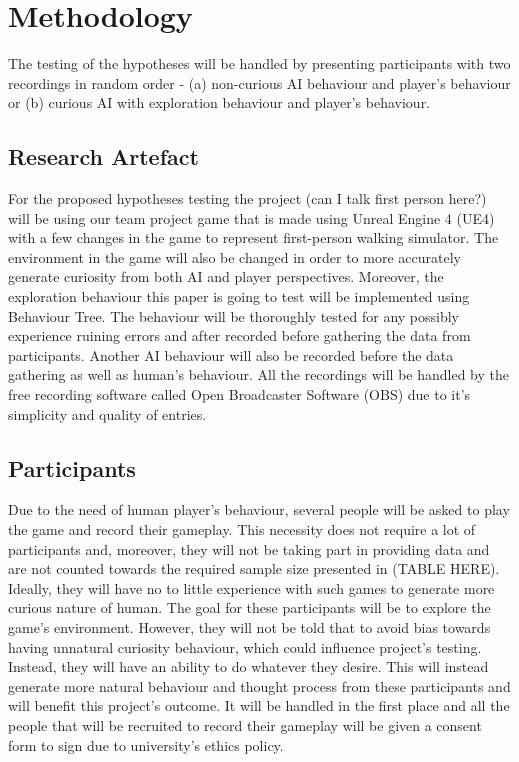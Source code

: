 \documentclass[journal]{IEEEtran}
\begin{document}
\section{Methodology}
The testing of the hypotheses will be handled by presenting participants with two recordings in random order - (a) non-curious AI behaviour and player's behaviour or (b) curious AI with exploration behaviour and player's behaviour.

\subsection{Research Artefact}
For the proposed hypotheses testing the project (can I talk first person here?) will be using our team project game that is made using Unreal Engine 4 (UE4) with a few changes in the game to represent first-person walking simulator. The environment in the game will also be changed in order to more accurately generate curiosity from both AI and player perspectives. Moreover, the exploration behaviour this paper is going to test will be implemented using Behaviour Tree. The behaviour will be thoroughly tested for any possibly experience ruining errors and after recorded before gathering the data from participants. Another AI behaviour will also be recorded before the data gathering as well as human's behaviour. All the recordings will be handled by the free recording software called Open Broadcaster Software (OBS) due to it's simplicity and quality of entries.

\subsection{Participants}
Due to the need of human player's behaviour, several people will be asked to play the game and record their gameplay. This necessity does not require a lot of participants and, moreover, they will not be taking part in providing data and are not counted towards the required sample size presented in (TABLE HERE). Ideally, they will have no to little experience with such games to generate more curious nature of human. The goal for these participants will be to explore the game's environment. However, they will not be told that to avoid bias towards having unnatural curiosity behaviour, which could influence project's testing. Instead, they will have an ability to do whatever they desire. This will instead generate more natural behaviour and thought process from these participants and will benefit this project's outcome. It will be handled in the first place and all the people that will be recruited to record their gameplay will be given a consent form to sign due to university's ethics policy. 
\end{document}
